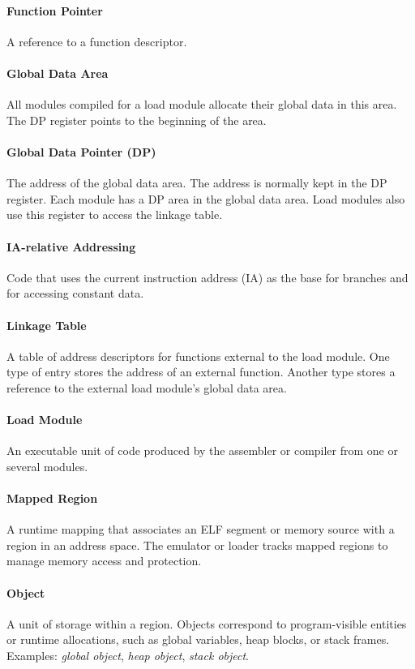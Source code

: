 \paragraph{Function Pointer}
A reference to a function descriptor.

\paragraph{Global Data Area}
All modules compiled for a load module allocate their global data in this area. The DP register points to the beginning of the area.

\paragraph{Global Data Pointer (DP)}
The address of the global data area. The address is normally kept in the DP register. Each module has a DP area in the global data area. Load modules also use this register to access the linkage table.

\paragraph{IA-relative Addressing}
Code that uses the current instruction address (IA) as the base for branches and for accessing constant data.

\paragraph{Linkage Table}
A table of address descriptors for functions external to the load module. One type of entry stores the address of an external function. Another type stores a reference to the external load module's global data area.

\paragraph{Load Module}
An executable unit of code produced by the assembler or compiler from one or several modules.

\paragraph{Mapped Region}
A runtime mapping that associates an ELF segment or memory source with a region in an address space. The emulator or loader tracks mapped regions to manage memory access and protection.

\paragraph{Object}
A unit of storage within a region. Objects correspond to program-visible entities or runtime allocations, such as global variables, heap blocks, or stack frames.  
Examples: \textit{global object}, \textit{heap object}, \textit{stack object}.


